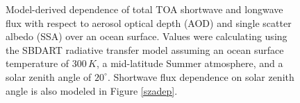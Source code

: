 \documentclass[12pt]{article}
\begin{document}
    \begin{figure}[h!]\label{flux-interp}
        \centering
        \begin{center}
        \end{center}
        \caption{Model-derived dependence of total TOA shortwave and longwave flux with respect to aerosol optical depth (AOD) and single scatter albedo (SSA) over an ocean surface. Values were calculating using the SBDART radiative transfer model assuming an ocean surface temperature of $300\,\si{K}$, a mid-latitude Summer atmosphere, and a solar zenith angle of $20^\circ$. Shortwave flux dependence on solar zenith angle is also modeled in Figure \ref{szadep}.}
        \label{aero-model}
    \end{figure}
\end{document}
